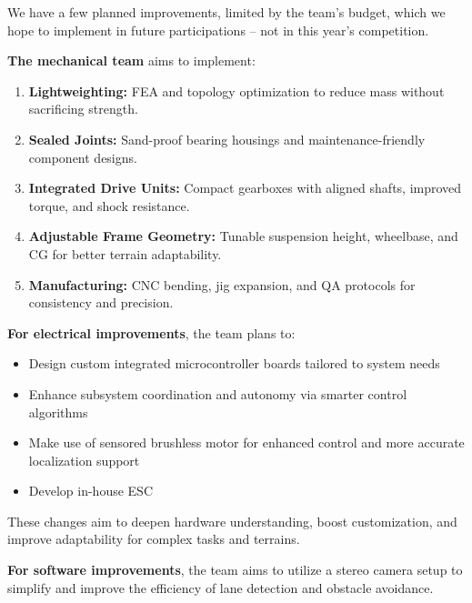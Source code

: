 \documentclass[12pt,a4paper,twocolumn]{article}
\begin{document}
We have a few planned improvements, limited by the team's budget, which we hope to implement in future participations -- not in this year's competition.

\textbf{The mechanical team} aims to implement:

\begin{enumerate}[label=\textbf{\alph*.}, itemsep=1pt, parsep=0pt]
    \item \textbf{Lightweighting:} FEA and topology optimization to reduce mass without sacrificing strength.
    \item \textbf{Sealed Joints:} Sand-proof bearing housings and maintenance-friendly component designs.
    \item \textbf{Integrated Drive Units:} Compact gearboxes with aligned shafts, improved torque, and shock resistance.
    \item \textbf{Adjustable Frame Geometry:} Tunable suspension height, wheelbase, and CG for better terrain adaptability.
    \item \textbf{Manufacturing:} CNC bending, jig expansion, and QA protocols for consistency and precision.
\end{enumerate}

\textbf{For electrical improvements}, the team plans to:

\begin{itemize}[itemsep=1pt]
    \setlength{\parskip}{0pt}
    \setlength{\parsep}{0pt}
    \item Design custom integrated microcontroller boards tailored to system needs
    \item Enhance subsystem coordination and autonomy via smarter control algorithms
    \item Make use of sensored brushless motor for enhanced control and more accurate localization support
    \item Develop in-house ESC
\end{itemize}

These changes aim to deepen hardware understanding, boost customization, and improve adaptability for complex tasks and terrains.

\textbf{For software improvements}, the team aims to utilize a stereo camera setup to simplify and improve the efficiency of lane detection and obstacle avoidance.

\nocite{*}

\small

\end{document}

